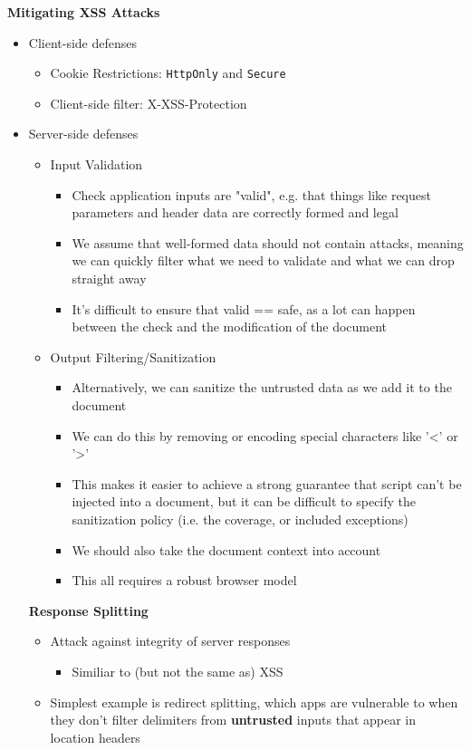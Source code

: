 \documentclass{article}
\begin{document}
\textbf{Mitigating XSS Attacks}
\begin{itemize}
    \item Client-side defenses
    \begin{itemize}
        \item Cookie Restrictions: \verb|HttpOnly| and \verb|Secure|
        \item Client-side filter: X-XSS-Protection
    \end{itemize}
    \item Server-side defenses
    \begin{itemize}
        \item Input Validation
        \begin{itemize}
            \item Check application inputs are "valid", e.g. that things like request parameters and header data are correctly formed and legal
            \item We assume that well-formed data should not contain attacks, meaning we can quickly filter what we need to validate and what we can drop straight away
            \item It's difficult to ensure that valid == safe, as a lot can happen between the check and the modification of the document
        \end{itemize}
        \item Output Filtering/Sanitization
        \begin{itemize}
            \item Alternatively, we can sanitize the untrusted data as we add it to the document
            \item We can do this by removing or encoding special characters like '<' or '>'
            \item This makes it easier to achieve a strong guarantee that script can't be injected into a document, but it can be difficult to specify the sanitization policy (i.e. the coverage, or included exceptions)
            \item We should also take the document context into account
            \item This all requires a robust browser model
    \end{itemize}
\end{itemize}

\textbf{Response Splitting}
\begin{itemize}
    \item Attack against integrity of server responses
    \begin{itemize}
        \item Similiar to (but not the same as) XSS
    \end{itemize}
    \item Simplest example is redirect splitting, which apps are vulnerable to when they don't filter delimiters from \textbf{untrusted} inputs that appear in location headers
\end{itemize}


\end{itemize}
\end{document}
